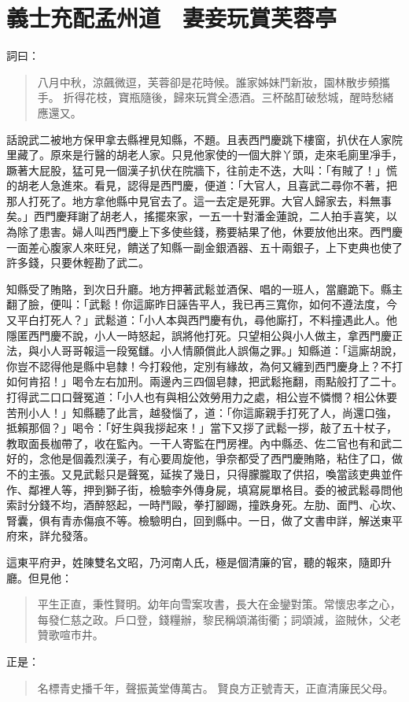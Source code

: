 
\chapter{義士充配孟州道　妻妾玩賞芙蓉亭}

詞曰：
\begin{quote}
八月中秋，涼飆微逗，芙蓉卻是花時候。誰家姊妹鬥新妝，園林散步頻攜手。
折得花枝，寶瓶隨後，歸來玩賞全憑酒。三杯酩酊破愁城，醒時愁緒應還又。
\end{quote}

話說武二被地方保甲拿去縣裡見知縣，不題。且表西門慶跳下樓窗，扒伏在人家院里藏了。原來是行醫的胡老人家。只見他家使的一個大胖丫頭，走來毛廁里凈手，蹶著大屁股，猛可見一個漢子扒伏在院牆下，往前走不迭，大叫：「有賊了！」慌的胡老人急進來。看見，認得是西門慶，便道：「大官人，且喜武二尋你不著，把那人打死了。地方拿他縣中見官去了。這一去定是死罪。大官人歸家去，料無事矣。」西門慶拜謝了胡老人，搖擺來家，一五一十對潘金蓮說，二人拍手喜笑，以為除了患害。婦人叫西門慶上下多使些錢，務要結果了他，休要放他出來。西門慶一面差心腹家人來旺兒，饋送了知縣一副金銀酒器、五十兩銀子，上下吏典也使了許多錢，只要休輕勘了武二。

知縣受了賄賂，到次日升廳。地方押著武鬆並酒保、唱的一班人，當廳跪下。縣主翻了臉，便叫：「武鬆！你這廝昨日誣告平人，我已再三寬你，如何不遵法度，今又平白打死人？」武鬆道：「小人本與西門慶有仇，尋他廝打，不料撞遇此人。他隱匿西門慶不說，小人一時怒起，誤將他打死。只望相公與小人做主，拿西門慶正法，與小人哥哥報這一段冤讎。小人情願償此人誤傷之罪。」知縣道：「這廝胡說，你豈不認得他是縣中皂隸！今打殺他，定別有緣故，為何又纏到西門慶身上？不打如何肯招！」喝令左右加刑。兩邊內三四個皂隸，把武鬆拖翻，雨點般打了二十。打得武二口口聲冤道：「小人也有與相公效勞用力之處，相公豈不憐憫？相公休要苦刑小人！」知縣聽了此言，越發惱了，道：「你這廝親手打死了人，尚還口強，抵賴那個？」喝令：「好生與我拶起來！」當下又拶了武鬆一拶，敲了五十杖子，教取面長枷帶了，收在監內。一干人寄監在門房裡。內中縣丞、佐二官也有和武二好的，念他是個義烈漢子，有心要周旋他，爭奈都受了西門慶賄賂，粘住了口，做不的主張。又見武鬆只是聲冤，延挨了幾日，只得朦朧取了供招，喚當該吏典並仵作、鄰裡人等，押到獅子街，檢驗李外傳身屍，填寫屍單格目。委的被武鬆尋問他索討分錢不均，酒醉怒起，一時鬥毆，拳打腳踢，撞跌身死。左肋、面門、心坎、腎囊，俱有青赤傷痕不等。檢驗明白，回到縣中。一日，做了文書申詳，解送東平府來，詳允發落。

這東平府尹，姓陳雙名文昭，乃河南人氏，極是個清廉的官，聽的報來，隨即升廳。但見他：
\begin{quote}
平生正直，秉性賢明。幼年向雪案攻書，長大在金鑾對策。常懷忠孝之心，每發仁慈之政。戶口登，錢糧辦，黎民稱頌滿街衢；詞頌減，盜賊休，父老贊歌喧市井。
\end{quote}
正是：
\begin{quote}
名標青史播千年，聲振黃堂傳萬古。
賢良方正號青天，正直清廉民父母。
\end{quote}

